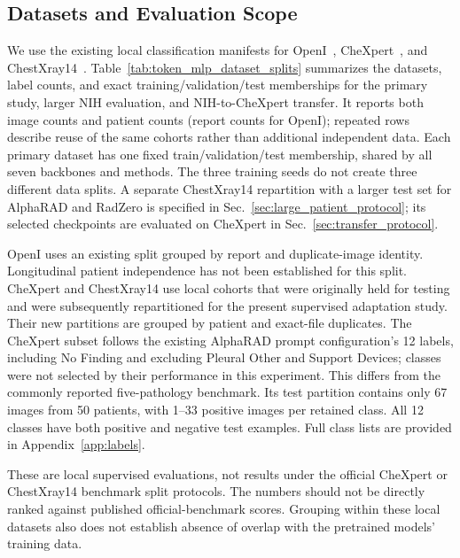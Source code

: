 \documentclass[10pt,twocolumn,letterpaper]{article}
\begin{document}
\subsection{Datasets and Evaluation Scope}
We use the existing local classification manifests for OpenI~\cite{demnerfushman2016openi}, CheXpert~\cite{irvin2019chexpert}, and ChestXray14~\cite{wang2017chestxray8}. Table~\ref{tab:token_mlp_dataset_splits} summarizes the datasets, label counts, and exact training/validation/test memberships for the primary study, larger NIH evaluation, and NIH-to-CheXpert transfer. It reports both image counts and patient counts (report counts for OpenI); repeated rows describe reuse of the same cohorts rather than additional independent data. Each primary dataset has one fixed train/validation/test membership, shared by all seven backbones and methods. The three training seeds do not create three different data splits. A separate ChestXray14 repartition with a larger test set for AlphaRAD and RadZero is specified in Sec.~\ref{sec:large_patient_protocol}; its selected checkpoints are evaluated on CheXpert in Sec.~\ref{sec:transfer_protocol}.



OpenI uses an existing split grouped by report and duplicate-image identity. Longitudinal patient independence has not been established for this split. CheXpert and ChestXray14 use local cohorts that were originally held for testing and were subsequently repartitioned for the present supervised adaptation study. Their new partitions are grouped by patient and exact-file duplicates. The CheXpert subset follows the existing AlphaRAD prompt configuration's 12 labels, including No Finding and excluding Pleural Other and Support Devices; classes were not selected by their performance in this experiment. This differs from the commonly reported five-pathology benchmark. Its test partition contains only 67 images from 50 patients, with 1--33 positive images per retained class. All 12 classes have both positive and negative test examples. Full class lists are provided in Appendix~\ref{app:labels}.

These are local supervised evaluations, not results under the official CheXpert or ChestXray14 benchmark split protocols. The numbers should not be directly ranked against published official-benchmark scores. Grouping within these local datasets also does not establish absence of overlap with the pretrained models' training data.
\end{document}
